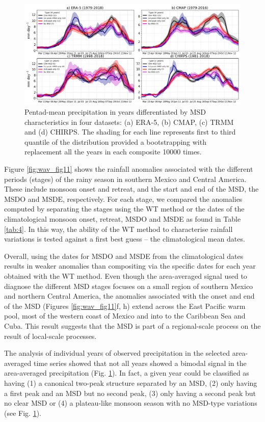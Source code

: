 \begin{figure}[t!]
 \noindent\includegraphics[width=\linewidth]{figures/wav_fig5c.png}
\caption[Seasonal cycle of precipitation for various MSD categories]{ Pentad-mean precipitation in years differentiated by MSD characteristics in four datasets: (a) ERA-5, (b) CMAP, (c) TRMM and (d) CHIRPS. The shading for each line represents first to third quantile of the distribution provided a bootstrapping with replacement all the years in each composite 10000 times.  }
\label{fig:S2}
\end{figure}

Figure \ref{fig:wav_fig11} shows the rainfall anomalies associated with the different periods (stages) of the rainy season in southern Mexico and Central America. These include monsoon onset and retreat, and the start and end of the MSD, the MSDO and MSDE, respectively. For each stage, we compared the anomalies computed by separating the stages using the WT method or the dates of the climatological monsoon onset, retreat, MSDO and MSDE as found in Table \ref{tab:4}. In this way, the ability of the WT method to characterise rainfall variations is tested against a first best guess -- the climatological mean dates. 

Overall, using the dates for MSDO and MSDE from the climatological dates results in weaker anomalies than compositing via the specific dates for each year obtained with the WT method.  Even though the area-averaged signal used to diagnose the different MSD stages focuses on a small region of southern Mexico and northern Central America, the anomalies associated with the onset and end of the MSD (Figures \ref{fig:wav_fig11}f, h) extend across the East Pacific warm pool, most of the western coast of Mexico and into to the Caribbean Sea and Cuba. This result suggests that the MSD is part of a regional-scale process on the result of local-scale processes. 

The analysis of individual years of observed precipitation in the selected area-averaged time series showed that not all years showed a bimodal signal in the area-averaged precipitation (Fig. \ref{fig:S2}). In fact, a given year could be classified as having (1) a canonical two-peak structure separated by an MSD, (2) only having a first peak and an MSD but no second peak, (3) only having a second peak but no clear MSD or (4) a plateau-like monsoon season with no MSD-type variations (see Fig. \ref{fig:S2}). 


